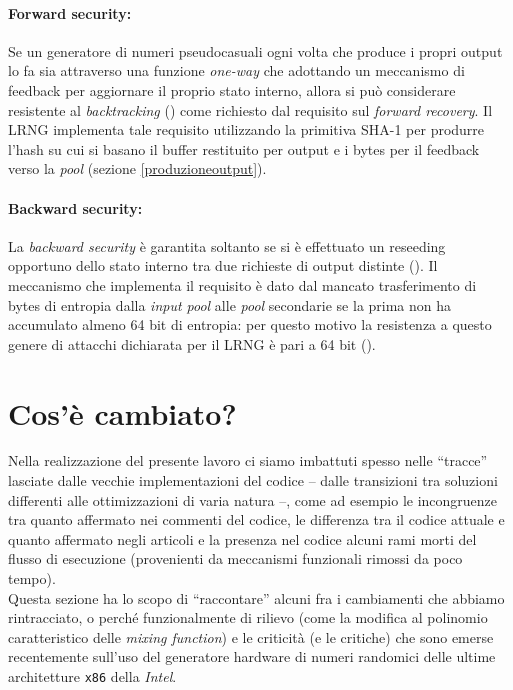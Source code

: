 \documentclass{article}
\begin{document}
 \paragraph{Forward security:} Se un generatore di numeri pseudocasuali
 ogni volta che produce i propri output lo fa sia attraverso una funzione
 \emph{one-way} che adottando un meccanismo di feedback per aggiornare il
 proprio stato interno, allora si può considerare resistente al
 \emph{backtracking} (\cite{bark}) come richiesto dal requisito sul
 \emph{forward recovery}. Il LRNG implementa tale requisito utilizzando la
 primitiva SHA-1 per produrre l'hash su cui si basano il buffer restituito per
 output e i bytes per il feedback verso la \emph{pool} (sezione
 \ref{produzioneoutput}).
 
 \paragraph{Backward security:} La \emph{backward security} è garantita soltanto
 se si è effettuato un reseeding opportuno dello stato interno tra due richieste
 di output distinte (\cite{bark}). Il meccanismo che implementa il requisito è
 dato dal mancato trasferimento di bytes di entropia dalla \emph{input pool}
 alle \emph{pool} secondarie se la prima non ha accumulato almeno 64 bit di
 entropia: per questo motivo la resistenza a questo genere di attacchi
 dichiarata per il LRNG è pari a 64 bit (\cite{lach}).
 
 
 
 

 
 \section{Cos'è cambiato?}
 Nella realizzazione del presente lavoro ci siamo imbattuti spesso nelle
 ``tracce'' lasciate dalle vecchie implementazioni del codice -- dalle
 transizioni tra soluzioni differenti alle ottimizzazioni di varia natura --,
 come ad esempio le incongruenze tra quanto affermato nei commenti del codice,
 le differenza tra il codice attuale e quanto affermato negli articoli e
 la presenza nel codice alcuni rami morti del flusso di esecuzione (provenienti
 da meccanismi funzionali rimossi da poco tempo).\\
 Questa sezione ha lo scopo di ``raccontare'' alcuni fra i cambiamenti che
 abbiamo rintracciato, o perché funzionalmente di rilievo (come la
 modifica al polinomio caratteristico delle \emph{mixing function}) e le
 criticità (e le critiche) che sono emerse recentemente sull'uso del generatore
 hardware di numeri randomici delle ultime architetture \verb+x86+ della
 \emph{Intel}.
 
\end{document}
